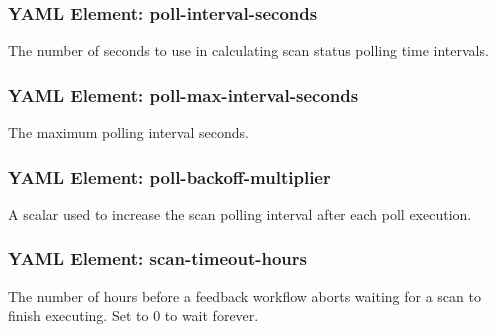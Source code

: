\subsubsection{YAML Element: poll-interval-seconds}\label{sec:yaml-scan-monitor-poll-interval-seconds}
The number of seconds to use in calculating scan status polling time intervals.


\subsubsection{YAML Element: poll-max-interval-seconds}\label{sec:yaml-scan-monitor-poll-max-interval-seconds}
The maximum polling interval seconds.


\subsubsection{YAML Element: poll-backoff-multiplier}\label{sec:yaml-scan-monitor-poll-backoff-multiplier}
A scalar used to increase the scan polling interval after each poll execution.

\subsubsection{YAML Element: scan-timeout-hours}\label{sec:yaml-scan-monitor-scan-timeout-hours}
The number of hours before a feedback workflow aborts waiting for a scan to finish executing.  Set to 0 to wait forever.
